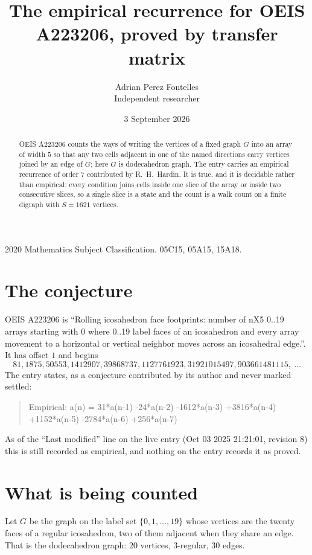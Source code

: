 \documentclass[11pt,a4paper]{article}
\title{The empirical recurrence for OEIS A223206, proved by transfer matrix}
\author{Adrian Perez Fontelles\\ \small Independent researcher}
\date{3 September 2026}
\theoremstyle{plain}
\theoremstyle{definition}
\begin{document}
\maketitle

\begin{abstract}
OEIS A223206 counts the ways of writing the vertices of a fixed graph $G$ into an array of width
$5$ so that any two cells adjacent in one of the named directions carry vertices joined by an
edge of $G$; here $G$ is dodecahedron graph. The entry carries an empirical recurrence of order $7$
contributed by R.~H.~Hardin. It is true, and it is decidable rather than empirical: every
condition joins cells inside one slice of the array or inside two consecutive slices, so a
single slice is a state and the count is a walk count on a finite digraph with $S=1621$ vertices.
\end{abstract}

\noindent\small 2020 Mathematics Subject Classification. 05C15, 05A15, 15A18.\normalsize

\section{The conjecture}

OEIS A223206 is ``Rolling icosahedron face footprints: number of nX5 0..19 arrays starting with 0 where 0..19 label faces of an icosahedron and every array movement to a horizontal or vertical neighbor moves across an icosahedral edge.''. It has offset $1$ and begins
\[
81, 1875, 50553, 1412907, 39868737, 1127761923, 31921015497, 903661481115,\ \dots
\]
The entry states, as a conjecture contributed by its author and never marked settled:
\begin{quote}
Empirical: a(n) = 31*a(n-1) -24*a(n-2) -1612*a(n-3) +3816*a(n-4) +1152*a(n-5) -2784*a(n-6) +256*a(n-7)
\end{quote}
As of the ``Last modified'' line on the live entry (Oct 03 2025 21:21:01, revision 8) this is still
recorded as empirical, and nothing on the entry records it as proved.

\section{What is being counted}

Let $G$ be the graph on the label set $\{0,1,\dots,19\}$ whose vertices are the twenty faces of a regular icosahedron, two of them adjacent when they share an edge. That is the dodecahedron graph: $20$ vertices, $3$-regular, $30$ edges.
\end{document}
